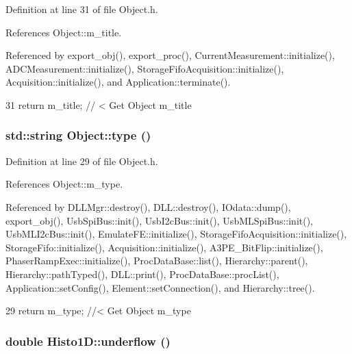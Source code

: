 Definition at line 31 of file Object.h.

References Object::m\_\-title.

Referenced by export\_\-obj(), export\_\-proc(), CurrentMeasurement::initialize(), ADCMeasurement::initialize(), StorageFifoAcquisition::initialize(), Acquisition::initialize(), and Application::terminate().


\begin{DoxyCode}
31 { return m_title;      } // < Get Object m_title
\end{DoxyCode}
\hypertarget{classObject_a84f99f70f144a83e1582d1d0f84e4e62}{
\subsubsection[{type}]{\setlength{\rightskip}{0pt plus 5cm}std::string Object::type ()}}
\label{classObject_a84f99f70f144a83e1582d1d0f84e4e62}


Definition at line 29 of file Object.h.

References Object::m\_\-type.

Referenced by DLLMgr::destroy(), DLL::destroy(), IOdata::dump(), export\_\-obj(), UsbSpiBus::init(), UsbI2cBus::init(), UsbMLSpiBus::init(), UsbMLI2cBus::init(), EmulateFE::initialize(), StorageFifoAcquisition::initialize(), StorageFifo::initialize(), Acquisition::initialize(), A3PE\_\-BitFlip::initialize(), PhaserRampExec::initialize(), ProcDataBase::list(), Hierarchy::parent(), Hierarchy::pathTyped(), DLL::print(), ProcDataBase::procList(), Application::setConfig(), Element::setConnection(), and Hierarchy::tree().


\begin{DoxyCode}
29 { return m_type;       } //< Get Object m_type
\end{DoxyCode}
\hypertarget{classHisto1D_a3bac7a207b9ed5f828001119b2f14869}{
\subsubsection[{underflow}]{\setlength{\rightskip}{0pt plus 5cm}double Histo1D::underflow ()}}
\label{classHisto1D_a3bac7a207b9ed5f828001119b2f14869}


